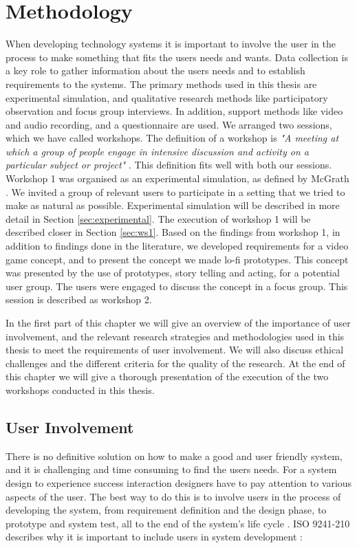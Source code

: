 \chapter{Methodology}
\label{chap:metode}
When developing technology systems it is important to involve the user in the process to make something that fits the users needs and wants. Data collection is a key role to gather information about the users needs and to establish requirements to the systems. The primary methods used in this thesis are experimental simulation, and qualitative research methods like participatory observation and focus group interviews. In addition, support methods like video and audio recording, and a questionnaire are used. We arranged two sessions, which we have called workshops.  The definition of a workshop is \emph{"A meeting at which a group of people engage in intensive discussion and activity on a particular subject or project"} \cite{dictionary}. This definition fits well with both our sessions. Workshop 1 was organised as an experimental simulation, as defined by McGrath \cite{McGrath}. We invited a group of relevant users to participate in a setting that we tried to make as natural as possible. Experimental simulation will be described in more detail in Section \ref{sec:experimental}. The execution of workshop 1 will be described closer in Section \ref{sec:ws1}. Based on the findings from workshop 1, in addition to findings done in the literature, we developed requirements for a video game concept, and to present the concept we made lo-fi prototypes. This concept was presented by the use of prototypes, story telling and acting, for a potential user group. The users were engaged to discuss the concept in a focus group. This session is described as workshop 2.

In the first part of this chapter we will give an overview of the importance of user involvement, and the relevant research strategies and methodologies used in this thesis to meet the requirements of user involvement. We will also discuss ethical challenges and the different criteria for the quality of the research. At the end of this chapter we will give a thorough presentation of the execution of the two workshops conducted in this thesis. 

\section{User Involvement}
\label{sec:userinvolvement}
There is no definitive solution on how to make a good and user friendly system, and it is challenging and time consuming to find the users needs. For a system design to experience success interaction designers have to pay attention to various aspects of the user. The best way to do this is to involve users in the process of developing the system, from requirement definition and the design phase, to prototype and system test, all to the end of the system's life cycle \cite{mmi}. ISO 9241-210 describes why it is important to include users in system development \cite{dis20109241}:

